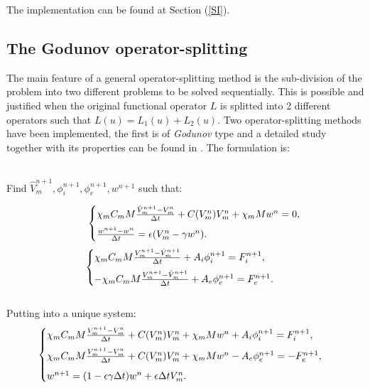 \documentclass[a4paper,11pt]{article}
\begin{document}
\noindent The implementation can be found at Section (\ref{SI}).

\subsection{The Godunov operator-splitting}
The main feature of a general operator-splitting method is the sub-division of the problem into two different problems to be solved sequentially. This is possible and justified when the original functional operator $L$ is splitted into 2 different operators such that $L(u)=L_1(u)+L_2(u)$.
Two operator-splitting methods have been implemented, the first is of \emph{Godunov} type and a detailed study together with its properties can be found in \cite{spiteri}. The formulation is: \\ \\
\begin{center}Find $\hat{V}_m^{n+1},\phi_i^{n+1},\phi_e^{n+1},w^{n+1}$ such that:\end{center}
\begin{equation*} \hspace{10mm}
\begin{cases}
\chi_m C_m M\frac{\hat{V}_m^{n+1} - V_m^n}{\Delta t} + C(V_m^n)V_m^n +\chi_mMw^n = 0,\vspace{2mm}\\
\frac{w^{n+1}-w^n}{\Delta t} = \epsilon (V_m^n - \gamma w^n).
\end{cases}
\end{equation*}
\vspace{3mm}
\begin{equation*}
\begin{cases}
\chi_m C_m M\frac{V_m^{n+1} - \hat{V}_m^{n+1}}{\Delta t} + A_i\phi_i^{n+1} = F_i^{n+1}, \vspace{2mm}\\
-\chi_m C_m M\frac{V_m^{n+1} - \hat{V}_m^{n+1}}{\Delta t} + A_e\phi_e^{n+1} = F_e^{n+1}.
\end{cases}
\end{equation*}
\vspace{3mm} \\
\noindent Putting into a unique system:
\begin{equation}\label{Godunov}
\begin{cases}
\chi_m C_m M\frac{V_m^{n+1} - V_m^n}{\Delta t} + C(V_m^n)V_m^n +\chi_mMw^n + A_i \phi_i^{n+1}= F_i^{n+1}, \vspace{2mm}\\
\chi_m C_m M\frac{V_m^{n+1} - V_m^n}{\Delta t} + C(V_m^n)V_m^n +\chi_mMw^n - A_e \phi_e^{n+1}= -F_e^{n+1}, \vspace{2mm}\\
w^{n+1} = (1-\epsilon \gamma \Delta t) w^n + \epsilon \Delta t V_m^n.
\end{cases}
\end{equation} \vspace{3mm} \\
\end{document}
